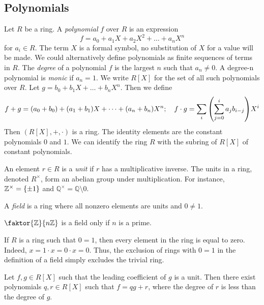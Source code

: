 \subsection{Polynomials}
\begin{definition}
	Let \( R \) be a ring.
	A \textit{polynomial} \( f \) over \( R \) is an expression
	\[ f = a_0 + a_1 X + a_2 X^2 + \dots + a_n X^n \]
	for \( a_i \in R \).
	The term \( X \) is a formal symbol, no substitution of \( X \) for a value will be made.
	We could alternatively define polynomials as finite sequences of terms in \( R \).
	The \textit{degree} of a polynomial \( f \) is the largest \( n \) such that \( a_n \neq 0 \).
	A degree-n polynomial is \textit{monic} if \( a_n = 1 \).
	We write \( R[X] \) for the set of all such polynomials over \( R \).
	Let \( g = b_0 + b_1 X + \dots + b_n X^n \).
	Then we define
	\[ f + g = (a_0 + b_0) + (a_1 + b_1) X + \dots + (a_n + b_n) X^n;\quad f \cdot g = \sum_i \qty(\sum_{j=0}^i a_j b_{i-j}) X^i \]
	Then \( (R[X], +, \cdot) \) is a ring.
	The identity elements are the constant polynomials \( 0 \) and \( 1 \).
	We can identify the ring \( R \) with the subring of \( R[X] \) of constant polynomials.
\end{definition}
\begin{definition}
	An element \( r \in R \) is a \textit{unit} if \( r \) has a multiplicative inverse.
	The units in a ring, denoted \( R^\times \), form an abelian group under multiplication.
	For instance, \( \mathbb Z^\times = \qty{\pm 1} \) and \( \mathbb Q^\times = \mathbb Q \setminus \qty{0} \).
\end{definition}
\begin{definition}
	A \textit{field} is a ring where all nonzero elements are units and \( 0 \neq 1 \).
\end{definition}
\begin{example}
	\( \faktor{\mathbb Z}{n\mathbb Z} \) is a field only if \( n \) is a prime.
\end{example}
\begin{remark}
	If \( R \) is a ring such that \( 0 = 1 \), then every element in the ring is equal to zero.
	Indeed, \( x = 1\cdot x = 0\cdot x = 0 \).
	Thus, the exclusion of rings with \( 0 = 1 \) in the definition of a field simply excludes the trivial ring.
\end{remark}
\begin{proposition}
	Let \( f, g \in R[X] \) such that the leading coefficient of \( g \) is a unit.
	Then there exist polynomials \( q, r \in R[X] \) such that \( f = qg + r \), where the degree of \( r \) is less than the degree of \( g \).
\end{proposition}
